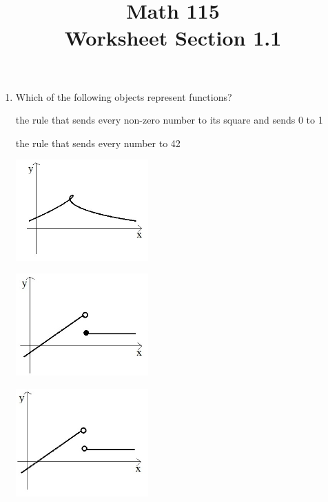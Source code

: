 \documentclass[11pt]{exam}
\title{\vspace{-0.5in} Math 115 \\ Worksheet Section 1.1}
\date{}
\theoremstyle{definition}
\begin{document}
\maketitle
\vspace{-0.75in}
\begin{questions}
 \question
  	\begin{enumerate}
	\item Which of the following objects represent functions?
	
	\hspace*{.2cm}the rule that sends every non-zero number to its square and sends 0 to 1
	
	\hspace*{.2cm}the rule that sends every number to 42
	
	\begin{multicols}{3}
	 
	
	\includegraphics[width=2in]{Figures/plot1.jpg}
	
	
	
	
	\includegraphics[width=2in]{Figures/plot2.jpg}
	
	
	
	
	\includegraphics[width=2in]{Figures/plot3.jpg}
	
	\end{multicols}
	

\end{enumerate}
\end{questions}
\end{document}

